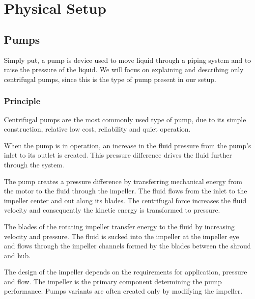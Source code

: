 \chapter{Physical Setup}\label{ch:physsetup}
\section{Pumps}
Simply put, a pump is device used to move liquid through a piping system and to raise the pressure of the liquid. We will focus on explaining 
and describing only centrifugal pumps, since this is the type of pump present in our setup. 
\subsection{Principle}
Centrifugal pumps are the most commonly used type of pump, due to its simple construction, relative low 
cost, reliability and quiet operation.

When the pump is in operation, an increase in the fluid pressure from the pump's inlet to its outlet is created.
This pressure difference drives the fluid further through the system.

The pump creates a pressure difference by transferring mechanical energy from the motor to the fluid through the impeller. 
The fluid flows from the inlet to the impeller center and out along its blades. The centrifugal force increases
the fluid velocity and consequently the kinetic energy is transformed to pressure. 

The blades of the rotating impeller transfer energy to the fluid by increasing velocity and pressure.
The fluid is sucked into the impeller at the impeller eye and flows through the impeller channels formed by the blades between the shroud and hub.

The design of the impeller depends on the requirements for application, pressure and flow. The impeller is the primary component 
determining the pump performance. Pumps variants are often created only by modifying the impeller.

